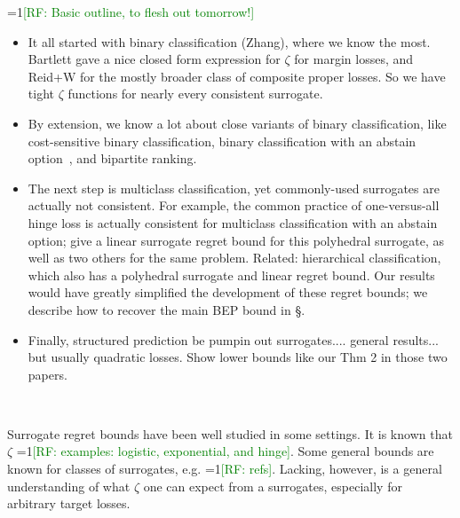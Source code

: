 \documentclass{article}
\theoremstyle{definition}\newtheorem{definition}{Definition}
\theoremstyle{definition}\newtheorem{assumption}{Assumption}
\newcommand{\Comments}{1}
\newcommand{\mynote}[2]{\ifnum\Comments=1\textcolor{#1}{#2}\fi}
\newcommand{\raf}[1]{\mynote{green}{[RF: #1]}}
\begin{document}
\raf{Basic outline, to flesh out tomorrow!}
\begin{itemize}
\item It all started with binary classification (Zhang), where we know the most.  Bartlett gave a nice closed form expression for $\zeta$ for margin losses, and Reid+W for the mostly broader class of composite proper losses.  So we have tight $\zeta$ functions for nearly every consistent surrogate.
\item By extension, we know a lot about close variants of binary classification, like cost-sensitive binary classification, binary classification with an abstain option~\cite{bartlett2008classification}, and bipartite ranking.
\item The next step is multiclass classification, yet commonly-used surrogates are actually not consistent.  For example, the common practice of one-versus-all hinge loss is actually consistent for multiclass classification with an abstain option; \citet{ramaswamy2018consistent} give a linear surrogate regret bound for this polyhedral surrogate, as well as two others for the same problem.  Related: hierarchical classification, which also has a polyhedral surrogate and linear regret bound.  Our results would have greatly simplified the development of these regret bounds; we describe how to recover the main BEP bound in \S.
\item Finally, structured prediction be pumpin out surrogates.... general results... but usually quadratic losses.  Show lower bounds like our Thm 2 in those two papers.
\end{itemize}

~\citep{zhang2004statistical,bartlett2006convexity,reid2009surrogate,mahdavi2014binary}

Surrogate regret bounds have been well studied in some settings.
It is known that $\zeta$ \raf{examples: logistic, exponential, and hinge}.
Some general bounds are known for classes of surrogates, e.g. \raf{refs}.
Lacking, however, is a general understanding of what $\zeta$ one can expect from a surrogates, especially for arbitrary target losses.


\end{document}
